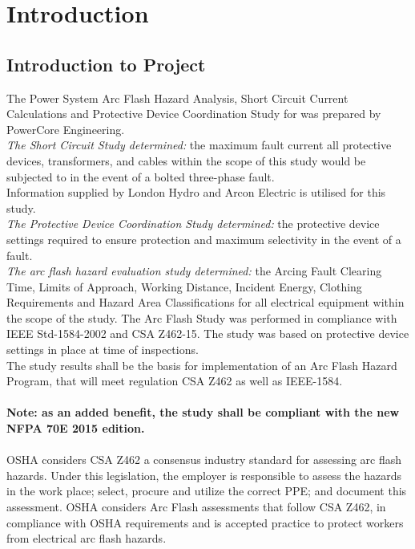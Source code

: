 
\section{Introduction}
\label{af:intro}

\subsection{Introduction to Project}
\label{af:intro:proj}

\noindent The Power System Arc Flash Hazard Analysis, Short Circuit Current Calculations and Protective Device Coordination Study for \Customer{} was prepared by PowerCore Engineering.\\

\noindent\emph{The Short Circuit Study determined:} the maximum fault current all protective devices, transformers, and cables within the scope of this study would be subjected to in the event of a bolted three-phase fault.\\
   
\noindent Information supplied by London Hydro and Arcon Electric is utilised for this study.\\

\noindent\emph{The Protective Device Coordination Study determined:} the protective device settings required to ensure protection and maximum selectivity in the event of a fault.\\

\noindent\emph{The arc flash hazard evaluation study determined:} the Arcing Fault Clearing Time, Limits of Approach, Working Distance, Incident Energy, Clothing Requirements and Hazard Area Classifications for all electrical equipment within the scope of the study.  The Arc Flash Study was performed in compliance with IEEE Std-1584-2002 and CSA Z462-15. The study was based on protective device settings in place at time of inspections.\\

\noindent The study results shall be the basis for implementation of an Arc Flash Hazard Program, that will meet regulation CSA Z462 as well as IEEE-1584.\\
\\
\textbf{Note: as an added benefit, the study shall be compliant with the new NFPA 70E 2015 edition.}\\
\\
OSHA considers CSA Z462 a consensus industry standard for assessing arc flash hazards. Under this legislation, the employer is responsible to assess the hazards in the work place; select, procure and utilize the correct PPE; and document this assessment. OSHA considers Arc Flash assessments that follow CSA Z462, in compliance with OSHA requirements and is accepted practice to protect workers from electrical arc flash hazards.\\


